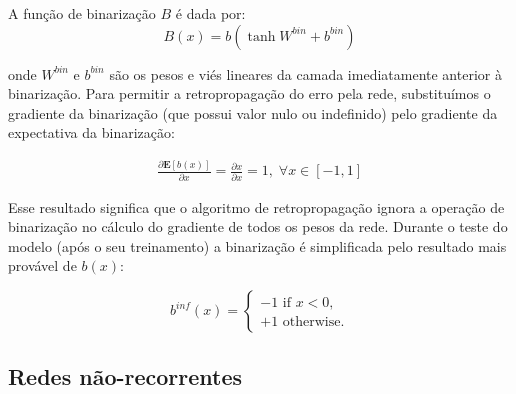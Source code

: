 


A função de binarização $B$ é dada por: 
\begin{equation}
B(x) = b(\tanh{W^{bin} + b^{bin}})
\end{equation}

\noindent onde $W^{bin}$ e $b^{bin}$ são os pesos e viés lineares da camada imediatamente anterior à binarização. Para permitir a retropropagação do erro pela rede, substituímos o gradiente da binarização (que possui valor nulo ou indefinido) pelo gradiente da expectativa da binarização:

\begin{equation}
\begin{aligned}
\displaystyle \frac{\partial \mathbf{E}[b(x)]}{\partial x} = \displaystyle \frac{\partial x}{\partial x} =1,  \; \forall x \in [-1, 1] 
\end{aligned}
\end{equation}

Esse resultado significa que o algoritmo de retropropagação ignora a operação de binarização no cálculo do gradiente de todos os pesos da rede. 
Durante o teste do modelo (após o seu treinamento) a binarização é simplificada pelo resultado mais provável de $b(x)$:

\begin{equation}
b^{inf}(x) = \left\{
\begin{array}{ll}
-1 \text{ if } x < 0, \\
+1 \text{ otherwise}.
\end{array}
\right. 
\end{equation}


\subsection{Redes não-recorrentes}

